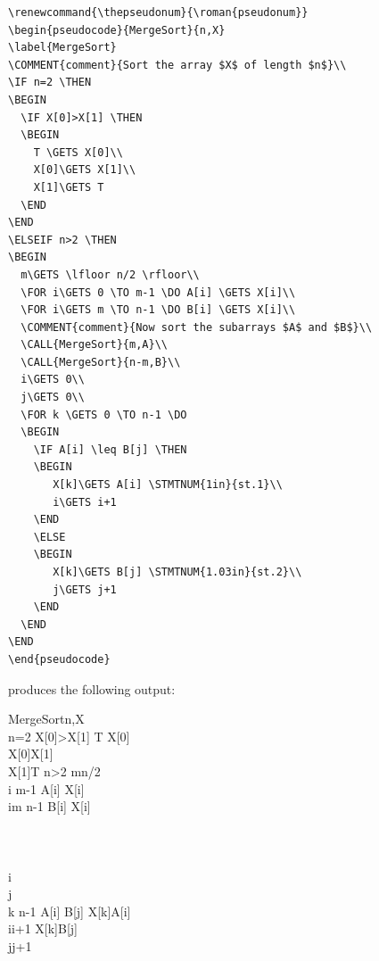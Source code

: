 \documentclass[a4]{article}
\begin{document}
\begin{verbatim}
\renewcommand{\thepseudonum}{\roman{pseudonum}}
\begin{pseudocode}{MergeSort}{n,X}
\label{MergeSort}
\COMMENT{comment}{Sort the array $X$ of length $n$}\\
\IF n=2 \THEN
\BEGIN
  \IF X[0]>X[1] \THEN
  \BEGIN
    T \GETS X[0]\\
    X[0]\GETS X[1]\\
    X[1]\GETS T
  \END
\END
\ELSEIF n>2 \THEN
\BEGIN
  m\GETS \lfloor n/2 \rfloor\\
  \FOR i\GETS 0 \TO m-1 \DO A[i] \GETS X[i]\\
  \FOR i\GETS m \TO n-1 \DO B[i] \GETS X[i]\\
  \COMMENT{comment}{Now sort the subarrays $A$ and $B$}\\
  \CALL{MergeSort}{m,A}\\
  \CALL{MergeSort}{n-m,B}\\
  i\GETS 0\\
  j\GETS 0\\
  \FOR k \GETS 0 \TO n-1 \DO
  \BEGIN
    \IF A[i] \leq B[j] \THEN
    \BEGIN
       X[k]\GETS A[i] \STMTNUM{1in}{st.1}\\
       i\GETS i+1
    \END
    \ELSE
    \BEGIN
       X[k]\GETS B[j] \STMTNUM{1.03in}{st.2}\\
       j\GETS j+1
    \END
  \END
\END
\end{pseudocode}
\end{verbatim}

\noindent{}produces the following output:

\renewcommand{\thepseudonum}{\roman{pseudonum}}
\begin{pseudocode}{MergeSort}{n,X}
\label{MergeSort}
\\
\IF n=2 \THEN
\BEGIN
  \IF X[0]>X[1] \THEN
  \BEGIN
    T \GETS X[0]\\
    X[0]\GETS X[1]\\
    X[1]\GETS T
  \END
\END
\ELSEIF n>2 \THEN
\BEGIN
  m\GETS \lfloor n/2 \rfloor\\
  \FOR i   \TO m-1 \DO A[i] \GETS X[i]\\
  \FOR i\GETS m \TO n-1 \DO B[i] \GETS X[i]\\
  \\
  \\
  \\
  i\\
  j\\
  \FOR k  \TO n-1 \DO
  \BEGIN
    \IF A[i] \leq B[j] \THEN
    \BEGIN
       X[k]\GETS A[i] \\
       i\GETS i+1
    \END
    \ELSE
    \BEGIN
       X[k]\GETS B[j] \\
       j\GETS j+1
    \END
  \END
\END
\end{pseudocode}
\end{document}
